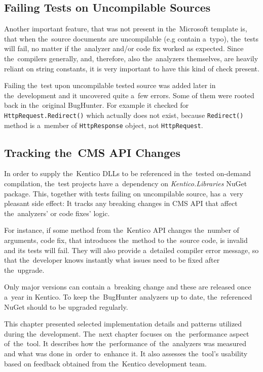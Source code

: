 \documentclass[
  digital, %
  table,   %
  lof,     %
  lot,     %
  oneside,
]{fithesis3}
\begin{document}
\subsection{Failing Tests on Uncompilable Sources}
Another important feature, that was not present in the~Microsoft template is, that when the~source documents are uncompilable (e.g contain a~typo), the~tests will fail, no matter if the~analyzer and/or code fix worked as expected. Since the~compilers generally, and, therefore, also the~analyzers themselves, are heavily reliant on string constants, it is very important to have this kind of check present.

Failing the~test upon uncompilable tested source was added later in the~development and it uncovered quite a~few errors. Some of them were rooted back in the~original BugHunter. For example it checked for \texttt{HttpRequest.Redirect()} which actually does not exist, because \texttt{Redirect()} method is a~member of \texttt{HttpResponse} object, not \texttt{HttpRequest}.

\subsection{Tracking the~CMS API Changes}
In order to supply the~Kentico DLLs to be referenced in the~tested on-demand compilation, the~test projects have a~dependency on \textit{Kentico.Libraries} NuGet package. This, together with tests failing on uncompilable source, has a~very pleasant side effect: It tracks any breaking changes in CMS API that affect the~analyzers' or code fixes' logic.

For instance, if some method from the~Kentico API changes the~number of arguments, code fix, that introduces the~method to the~source code, is invalid and its tests will fail. They will also provide a~detailed compiler error message, so that the~developer knows instantly what issues need to be fixed after the~upgrade.

Only major versions can contain a~breaking change and these are released once a~year in Kentico. To keep the~BugHunter analyzers up to date, the~referenced NuGet should to be upgraded regularly.

\bigskip\noindent
This chapter presented selected implementation details and patterns utilized during the~development. The~next chapter focuses on~the~performance aspect of~the~tool. It describes how the~performance of~the~analyzers was measured and what was done in~order to~enhance it. It also assesses the~tool's usability based on feedback obtained from the~Kentico development team.
\end{document}

